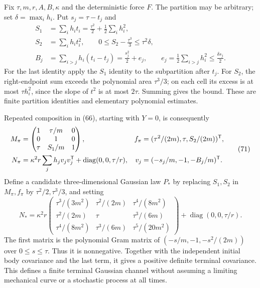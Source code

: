 \documentclass[11pt,a4paper]{article}
\begin{document}
Fix \(\tau,m,r,A,B,\kappa\) and the deterministic force \(F\). The
partition may be arbitrary; set \(\delta=\max_i h_i\). Put
\(s_j=\tau-t_j\) and \[\begin{aligned}
S_1&=\sum_i h_it_i
       =\frac{\tau^2}2+\frac12\sum_i h_i^2,\\
S_2&=\sum_i h_it_i^2,\qquad
0\le S_2-\frac{\tau^3}3\le\tau^2\delta,\\
B_j&=\sum_{i>j}h_i(t_i-t_j)
       =\frac{s_j^2}2+e_j,\qquad
e_j=\frac12\sum_{i>j}h_i^2\le\frac{\delta s_j}2.
\end{aligned}\tag{70}\] For the last identity apply the \(S_1\) identity
to the subpartition after \(t_j\). For \(S_2\), the right-endpoint sum
exceeds the polynomial area \(\tau^3/3\); on each cell its excess is at
most \(\tau h_i^2\), since the slope of \(t^2\) is at most \(2\tau\).
Summing gives the bound. These are finite partition identities and
elementary polynomial estimates.

Repeated composition in (66), starting with \(Y=0\), is consequently
\[\begin{aligned}
M_\pi&=\begin{pmatrix}1&\tau/m&0\\0&1&0\\
                       \tau&S_1/m&1\end{pmatrix},&
f_\pi&=(\tau^2/(2m),\tau,S_2/(2m))^{\sf T},\\
N_\pi&=\kappa^2r\sum_jh_jv_jv_j^{\sf T}
                    +\operatorname{diag}(0,0,\tau/r),&
v_j&=(-s_j/m,-1,-B_j/m)^{\sf T}.
\end{aligned}\tag{71}\] Define a candidate three-dimensional Gaussian
law \(P_*\) by replacing \(S_1,S_2\) in \(M_\pi,f_\pi\) by
\(\tau^2/2,\tau^3/3\), and setting \[N_*=\kappa^2r
\begin{pmatrix}
\tau^3/(3m^2)&\tau^2/(2m)&\tau^4/(8m^2)\\
\tau^2/(2m)&\tau&\tau^3/(6m)\\
\tau^4/(8m^2)&\tau^3/(6m)&\tau^5/(20m^2)
\end{pmatrix}
+\operatorname{diag}(0,0,\tau/r).\tag{72}\] The first matrix is the
polynomial Gram matrix of \((-s/m,-1,-s^2/(2m))\) over
\(0\le s\le\tau\). Thus it is nonnegative. Together with the independent
initial body covariance and the last term, it gives a positive definite
terminal covariance. This defines a finite terminal Gaussian channel
without assuming a limiting mechanical curve or a stochastic process at
all times.
\end{document}
